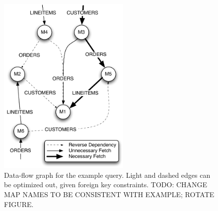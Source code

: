 \begin{figure}
\begin{center}
\includegraphics[width=2.5in]{images/q12_graph.pdf}
\caption{Data-flow graph for the example query.  Light and dashed edges can be optimized out, given foreign key constraints.
TODO: CHANGE MAP NAMES TO BE CONSISTENT WITH EXAMPLE; ROTATE FIGURE.}
\label{fig:dataflow}
\end{center}
\end{figure}




